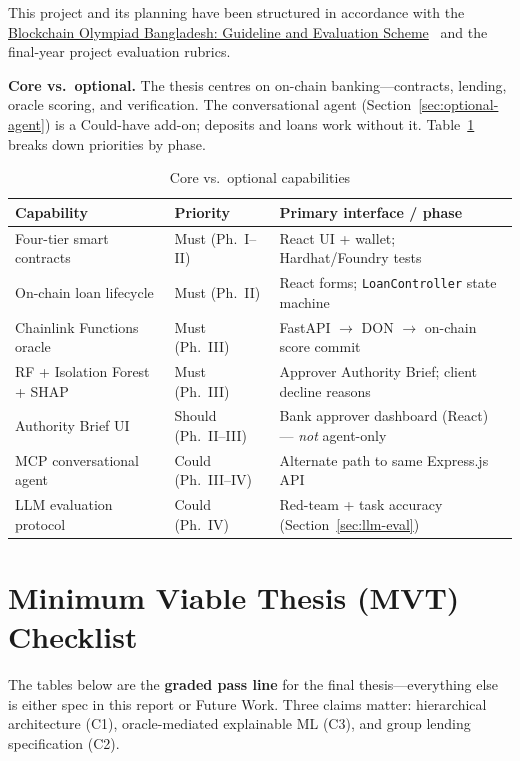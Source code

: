 \documentclass[12pt, a4paper]{report}
\newcommand{\tableheadcolor}{\rowcolor{TableHeadBg}}
\begin{document}
This project and its planning have been structured in accordance with the \href{https://bcolbd.org/uploads/guideline/BLOCKCHAIN\%20OLYMPIAD\%20BANGLADESH\%20Blockchain\%20Guideline.pdf}{Blockchain Olympiad Bangladesh: Guideline and Evaluation Scheme}~ and the final-year project evaluation rubrics.

\noindent\textbf{Core vs.\ optional.} The thesis centres on on-chain banking---contracts, lending, oracle scoring, and verification. The conversational agent (Section~\ref{sec:optional-agent}) is a Could-have add-on; deposits and loans work without it. Table~\ref{tab:capability-priority} breaks down priorities by phase.

\begin{table}[H]
\centering
\caption[Core vs.\ optional capabilities]{Core vs.\ optional capabilities}
\label{tab:capability-priority}
\begin{tabular}{p{3.2cm}p{2.2cm}p{7.8cm}}
\toprule
\tableheadcolor
\textbf{Capability} & \textbf{Priority} & \textbf{Primary interface / phase} \\
\midrule
Four-tier smart contracts & Must (Ph.~I--II) & React UI + wallet; Hardhat/Foundry tests \\
On-chain loan lifecycle & Must (Ph.~II) & React forms; \texttt{LoanController} state machine \\
Chainlink Functions oracle & Must (Ph.~III) & FastAPI $\to$ DON $\to$ on-chain score commit \\
RF + Isolation Forest + SHAP & Must (Ph.~III) & Approver Authority Brief; client decline reasons \\
Authority Brief UI & Should (Ph.~II--III) & Bank approver dashboard (React) --- \textit{not} agent-only \\
MCP conversational agent & Could (Ph.~III--IV) & Alternate path to same Express.js API \\
LLM evaluation protocol & Could (Ph.~IV) & Red-team + task accuracy (Section~\ref{sec:llm-eval}) \\
\bottomrule
\end{tabular}
\end{table}

\section{Minimum Viable Thesis (MVT) Checklist}
\label{sec:mvt-checklist}

The tables below are the \textbf{graded pass line} for the final thesis---everything else is either spec in this report or Future Work. Three claims matter: hierarchical architecture (C1), oracle-mediated explainable ML (C3), and group lending specification (C2).
\end{document}
